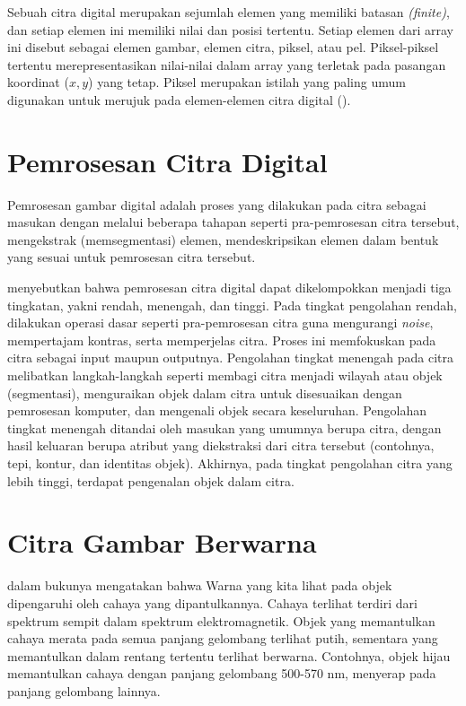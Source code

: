 Sebuah citra digital merupakan sejumlah elemen yang memiliki batasan \emph{(finite)}, 
dan setiap elemen ini memiliki nilai dan posisi tertentu. Setiap elemen dari array 
ini disebut sebagai elemen gambar, elemen citra, piksel, atau pel. Piksel-piksel 
tertentu merepresentasikan nilai-nilai dalam array yang terletak pada pasangan 
koordinat (\(x,y\)) yang tetap. Piksel merupakan istilah yang paling umum digunakan 
untuk merujuk pada elemen-elemen citra digital (\cite{Gonzalez:2018}).

\section{Pemrosesan Citra Digital}
Pemrosesan gambar digital adalah proses yang dilakukan pada citra sebagai masukan
dengan melalui beberapa tahapan seperti pra-pemrosesan citra tersebut, mengekstrak 
(memsegmentasi) elemen, mendeskripsikan elemen dalam bentuk yang sesuai 
untuk pemrosesan citra tersebut.

\cite{Gonzalez:2018} menyebutkan bahwa pemrosesan citra digital dapat dikelompokkan 
menjadi tiga tingkatan, yakni rendah, menengah, dan tinggi. Pada tingkat pengolahan 
rendah, dilakukan operasi dasar seperti pra-pemrosesan citra guna mengurangi \emph{noise}, 
mempertajam kontras, serta memperjelas citra. Proses ini memfokuskan pada citra 
sebagai input maupun outputnya. Pengolahan tingkat menengah pada citra melibatkan 
langkah-langkah seperti membagi citra menjadi wilayah atau objek (segmentasi), 
menguraikan objek dalam citra untuk disesuaikan dengan pemrosesan komputer, dan 
mengenali objek secara keseluruhan. Pengolahan tingkat menengah ditandai oleh 
masukan yang umumnya berupa citra, dengan hasil keluaran berupa atribut yang 
diekstraksi dari citra tersebut (contohnya, tepi, kontur, dan identitas objek).
Akhirnya, pada tingkat pengolahan citra yang lebih tinggi, terdapat pengenalan 
objek dalam citra.

\section{Citra Gambar Berwarna}

\cite{Gonzalez:2018} dalam bukunya mengatakan bahwa Warna yang kita lihat pada objek 
dipengaruhi oleh cahaya yang dipantulkannya. Cahaya terlihat terdiri dari spektrum 
sempit dalam spektrum elektromagnetik. Objek yang memantulkan cahaya merata pada 
semua panjang gelombang terlihat putih, sementara yang memantulkan dalam rentang 
tertentu terlihat berwarna. Contohnya, objek hijau memantulkan cahaya dengan panjang 
gelombang 500-570 nm, menyerap pada panjang gelombang lainnya.

